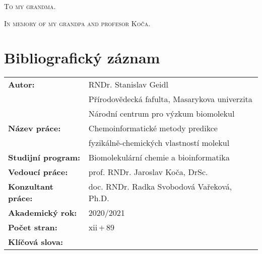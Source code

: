 \documentclass[11pt,b5paper,oneside,final]{book}
\begin{document}
\vspace{5mm}


\vspace{1cm}


\vfill


\vspace{1cm}

\normalsize
\clearpage

\begin{center}
\vspace*{9cm}
  \textsc{To my grandma.}

  \textsc{In memory of my grandpa and profesor Koča.}
\end{center}
\normalsize
\clearpage

\vfill
\section*{Bibliografický záznam}
\def\arraystretch{1.5}
\begin{tabular}{ lp{7.5cm} } 
  \textbf{Autor:}            & RNDr. Stanislav Geidl \\
                             & Přírodovědecká fafulta, Masarykova univerzita \\
                             & Národní centrum pro výzkum biomolekul \\
  \textbf{Název práce:}      & Chemoinformatické metody predikce \\
                             & fyzikálně-chemických vlastností molekul \\
  \textbf{Studijní program:} & Biomolekulární chemie a bioinformatika \\
  \textbf{Vedoucí práce:}    & prof. RNDr. Jaroslav Koča, DrSc. \\
  \textbf{Konzultant práce:} & doc. RNDr. Radka Svobodová Vařeková, Ph.D. \\
  \textbf{Akademický rok:}   & 2020/2021 \\
  \textbf{Počet stran:}      & xii\,$+$\,89\\
  \textbf{Klíčová slova:}    &  \\
\end{tabular}
\normalsize
\clearpage
\end{document}
